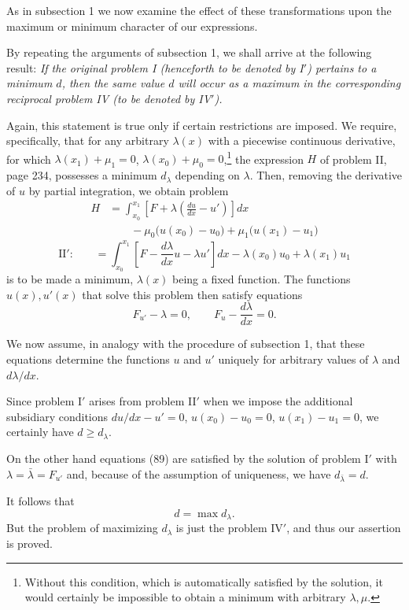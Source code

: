 As in subsection 1 we now examine the effect of these transformations upon the maximum or minimum character of our expressions.

By repeating the arguments of subsection 1, we shall arrive at the following result: \emph{If the original problem I (henceforth to be denoted by I$'$) pertains to a minimum $d$, then the same value $d$ will occur as a maximum in the corresponding reciprocal problem IV (to be denoted by IV$'$).}

Again, this statement is true only if certain restrictions are imposed. We require, specifically, that for any arbitrary $\lambda(x)$ with a piecewise continuous derivative, for which $\lambda(x_1)+\mu_1=0$, $\lambda(x_0)+\mu_0=0$,\footnote{Without this condition, which is automatically satisfied by the solution, it would certainly be impossible to obtain a minimum with arbitrary $\lambda,\mu$.} the expression $H$ of problem II, page 234, possesses a minimum $d_\lambda$ depending on $\lambda$. Then, removing the derivative of $u$ by partial integration, we obtain problem
\[
\begin{aligned}
H&=\int_{x_0}^{x_1}\left[F+\lambda\left(\frac{du}{dx}-u'\right)\right]dx\\
&\qquad-\mu_0\bigl(u(x_0)-u_0\bigr)+\mu_1\bigl(u(x_1)-u_1\bigr)
\end{aligned}
\]
\[
\text{II$'$:}\qquad
=\int_{x_0}^{x_1}\left[F-\frac{d\lambda}{dx}u-\lambda u'\right]dx-\lambda(x_0)u_0+\lambda(x_1)u_1
\]
is to be made a minimum, $\lambda(x)$ being a fixed function. The functions $u(x),u'(x)$ that solve this problem then satisfy equations
\begin{equation}\tag{89}
F_{u'}-\lambda=0,\qquad F_u-\frac{d\lambda}{dx}=0.
\end{equation}

We now assume, in analogy with the procedure of subsection 1, that these equations determine the functions $u$ and $u'$ uniquely for arbitrary values of $\lambda$ and $d\lambda/dx$.

Since problem I$'$ arises from problem II$'$ when we impose the additional subsidiary conditions $du/dx-u'=0$, $u(x_0)-u_0=0$, $u(x_1)-u_1=0$, we certainly have $d\ge d_\lambda$.

On the other hand equations (89) are satisfied by the solution of problem I$'$ with $\lambda=\bar\lambda=F_{u'}$ and, because of the assumption of uniqueness, we have $d_{\bar\lambda}=d$.

It follows that
\[
d=\max d_\lambda.
\]
But the problem of maximizing $d_\lambda$ is just the problem IV$'$, and thus our assertion is proved.

